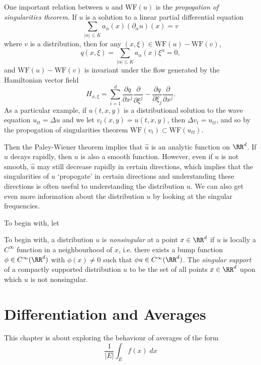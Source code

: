 One important relation between $u$ and $\text{WF}(u)$ is the \emph{propogation of singularities theorem}. If $u$ is a solution to a linear partial differential equation
%
\[ \sum_{|\alpha| \leq K} a_\alpha(x) (\partial_\alpha u)(x) = v \]
%
where $v$ is a distribution, then for any $(x,\xi) \in \text{WF}(u) - \text{WF}(v)$,
%
\[ q(x,\xi) = \sum_{|\alpha| \leq K} a_\alpha(x) \xi^\alpha = 0, \]
%
and $\text{WF}(u) - \text{WF}(v)$ is invariant under the flow generated by the Hamiltonian vector field
%
\[ H_{x,\xi} = \sum_{i = 1}^d \frac{\partial q}{\partial x^j} \frac{\partial}{\partial \xi^j} - \frac{\partial q}{\partial \xi_j} \frac{\partial}{\partial x^j}. \]
%
As a particular example, if $u(t,x,y)$ is a distributional solution to the wave equation $u_{tt} = \Delta u$ and we let $v_t(x,y) = u(t,x,y)$, then $\Delta v_t = u_{tt}$, and so by the propogation of singularities theorem $\text{WF}(v_t) \subset \text{WF}(u_{tt})$.

Then the Paley-Wiener theorem implies that $\widehat{u}$ is an analytic function on $\RR^d$. If $\widehat{u}$ decays rapidly, then $u$ is also a smooth function. However, even if $u$ is not smooth, $\widehat{u}$ may still decrease rapidly in certain directions, which implies that the singularities of $u$ `propogate' in certain directions and understanding these directions is often useful to understanding the distribution $u$. We can also get even more information about the distribution $u$ by looking at the singular frequencies.

To begin with, let 

To begin with, a distribution $u$ is \emph{nonsingular} at a point $x \in \RR^d$ if $u$ is locally a $C^\infty$ function in a neighbourhood of $x$, i.e. there exists a bump function $\phi \in C^\infty(\RR^d)$ with $\phi(x) \neq 0$ such that $\phi u \in C^\infty(\RR^d)$. The  \emph{singular support} of a compactly supported distribution $u$ to be the set of all points $x \in \RR^d$ upon which $u$ is not nonsingular.










\chapter{Differentiation and Averages}

This chapter is about exploring the behaviour of averages of the form
%
\[ \frac{1}{|E|} \int_E f(x)\; dx \]

